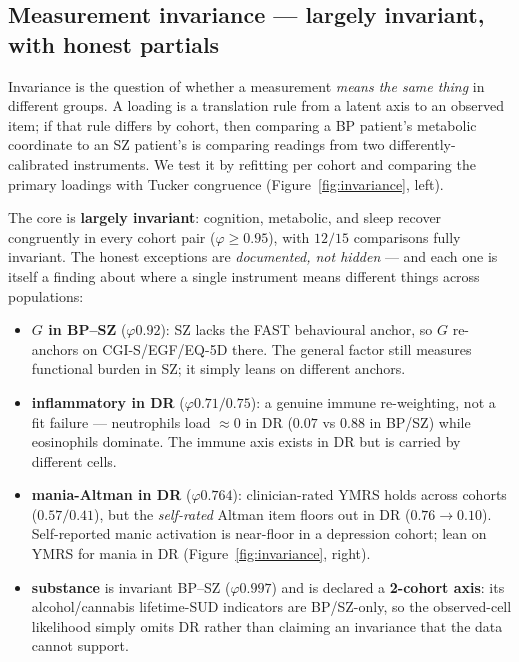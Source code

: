 \subsection{Measurement invariance --- largely invariant, with honest partials}
\label{sub:invariance}
Invariance is the question of whether a measurement \emph{means the same thing} in different
groups. A loading is a translation rule from a latent axis to an observed item; if that rule differs by cohort,
then comparing a BP patient's metabolic coordinate to an SZ patient's is comparing readings from two
differently-calibrated instruments. We test it by refitting per cohort and comparing the primary loadings with
Tucker congruence (Figure~\ref{fig:invariance}, left).

The core is \textbf{largely invariant}: cognition, metabolic, and sleep recover congruently in every cohort
pair ($\varphi\ge 0.95$), with $12/15$ comparisons fully invariant. The honest exceptions are
\emph{documented, not hidden} --- and each one is itself a finding about where a single instrument means
different things across populations:

\begin{itemize}\setlength{\itemsep}{1pt}
  \item \textbf{$G$ in BP--SZ} ($\varphi 0.92$): SZ lacks the FAST behavioural anchor, so $G$ re-anchors on
  CGI-S/EGF/EQ-5D there. The general factor still measures functional burden in SZ; it simply leans on
  different anchors.
  \item \textbf{inflammatory in DR} ($\varphi 0.71/0.75$): a genuine immune re-weighting, not a fit failure
  --- neutrophils load $\approx 0$ in DR ($0.07$ vs $0.88$ in BP/SZ) while eosinophils dominate. The immune
  axis exists in DR but is carried by different cells.
  \item \textbf{mania-Altman in DR} ($\varphi 0.764$): clinician-rated YMRS holds across cohorts
  ($0.57/0.41$), but the \emph{self-rated} Altman item floors out in DR ($0.76\to0.10$). Self-reported manic
  activation is near-floor in a depression cohort; lean on YMRS for mania in DR
  (Figure~\ref{fig:invariance}, right).
  \item \textbf{substance} is invariant BP--SZ ($\varphi 0.997$) and is declared a \textbf{2-cohort axis}: its
  alcohol/cannabis lifetime-SUD indicators are BP/SZ-only, so the observed-cell likelihood simply omits DR
  rather than claiming an invariance that the data cannot support.
\end{itemize}

